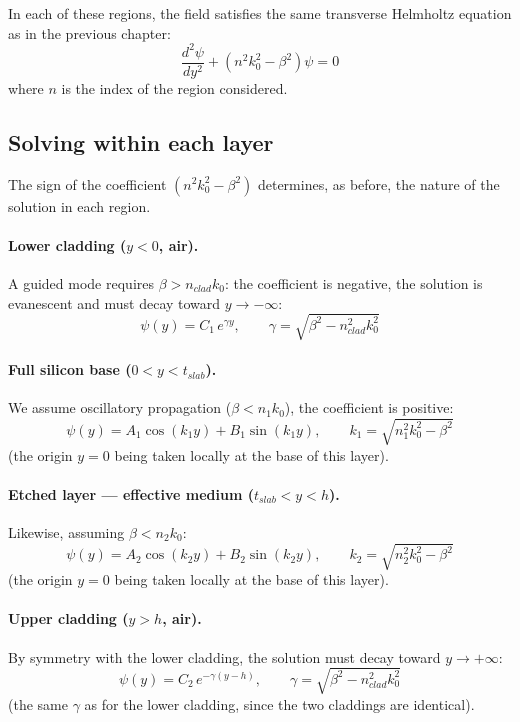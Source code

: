 \documentclass[a4paper,11pt]{report}
\begin{document}
In each of these regions, the field satisfies the same transverse Helmholtz equation as in the previous chapter:
\begin{equation}
\frac{d^2\psi}{dy^2} + \left(n^2k_0^2-\beta^2\right)\psi = 0
\label{eq:helmholtz_multicouche}
\end{equation}
where $n$ is the index of the region considered.

\subsection*{Solving within each layer}

The sign of the coefficient $(n^2k_0^2-\beta^2)$ determines, as before, the nature of the solution in each region.

\paragraph{Lower cladding ($y<0$, air).} A guided mode requires $\beta>n_{clad}k_0$: the coefficient is negative, the solution is evanescent and must decay toward $y\to-\infty$:
\begin{equation}
\psi(y) = C_1\,e^{\gamma y}, \qquad \gamma = \sqrt{\beta^2-n_{clad}^2k_0^2}
\end{equation}

\paragraph{Full silicon base ($0<y<t_{slab}$).} We assume oscillatory propagation ($\beta<n_1k_0$), the coefficient is positive:
\begin{equation}
\psi(y) = A_1\cos(k_1y) + B_1\sin(k_1y), \qquad k_1=\sqrt{n_1^2k_0^2-\beta^2}
\end{equation}
(the origin $y=0$ being taken locally at the base of this layer).

\paragraph{Etched layer --- effective medium ($t_{slab}<y<h$).} Likewise, assuming $\beta<n_2k_0$:
\begin{equation}
\psi(y) = A_2\cos(k_2y) + B_2\sin(k_2y), \qquad k_2=\sqrt{n_2^2k_0^2-\beta^2}
\end{equation}
(the origin $y=0$ being taken locally at the base of this layer).

\paragraph{Upper cladding ($y>h$, air).} By symmetry with the lower cladding, the solution must decay toward $y\to+\infty$:
\begin{equation}
\psi(y) = C_2\,e^{-\gamma(y-h)}, \qquad \gamma = \sqrt{\beta^2-n_{clad}^2k_0^2}
\end{equation}
(the same $\gamma$ as for the lower cladding, since the two claddings are identical).
\end{document}

